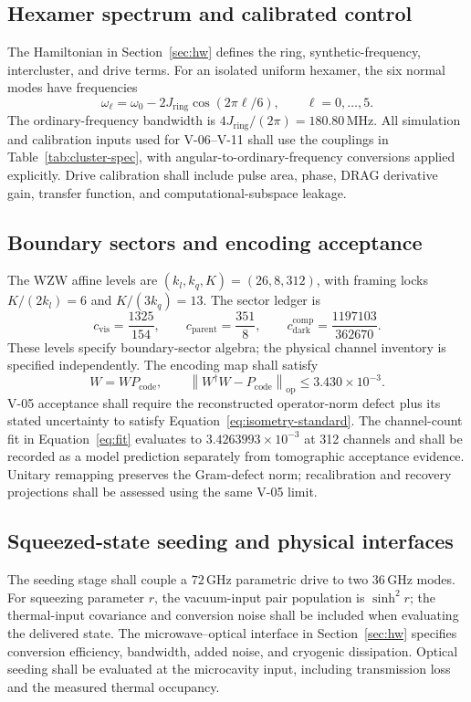 \documentclass[11pt,a4paper]{article}
\newcommand{\op}{\mathrm{op}}
\newcommand{\code}{\mathrm{code}}
\newcommand{\unit}[1]{\,\mathrm{#1}}
\begin{document}
\subsection{Hexamer spectrum and calibrated control}
The Hamiltonian in Section~\ref{sec:hw} defines the ring, synthetic-frequency,
intercluster, and drive terms. For an isolated uniform hexamer, the six normal modes
have frequencies
\[
 \omega_\ell=\omega_0-2J_{\mathrm{ring}}\cos(2\pi\ell/6),
 \qquad \ell=0,\ldots,5.
\]
The ordinary-frequency bandwidth is $4J_{\mathrm{ring}}/(2\pi)=180.80\unit{MHz}$.
All simulation and calibration inputs used for V-06--V-11 shall use the couplings
in Table~\ref{tab:cluster-spec}, with angular-to-ordinary-frequency conversions
applied explicitly. Drive calibration shall include pulse area, phase, DRAG
derivative gain, transfer function, and computational-subspace leakage.

\subsection{Boundary sectors and encoding acceptance}
The WZW affine levels are $(k_l,k_q,K)=(26,8,312)$, with framing locks
$K/(2k_l)=6$ and $K/(3k_q)=13$. The sector ledger is
\[
 c_{\mathrm{vis}}=\frac{1325}{154},\qquad
 c_{\mathrm{parent}}=\frac{351}{8},\qquad
 c_{\mathrm{dark}}^{\mathrm{comp}}=\frac{1197103}{362670}.
\]
These levels specify boundary-sector algebra; the physical channel inventory is
specified independently. The encoding map shall satisfy
\[
 W=WP_\code,\qquad
 \left\|W^\dagger W-P_\code\right\|_\op\le3.430\times10^{-3}.
\]
V-05 acceptance shall require the reconstructed operator-norm defect plus its stated
uncertainty to satisfy Equation~\ref{eq:isometry-standard}. The channel-count fit in
Equation~\ref{eq:fit} evaluates to $3.4263993\times10^{-3}$ at 312 channels and shall
be recorded as a model prediction separately from tomographic acceptance evidence.
Unitary remapping preserves the Gram-defect norm; recalibration and recovery
projections shall be assessed using the same V-05 limit.

\subsection{Squeezed-state seeding and physical interfaces}
The seeding stage shall couple a $72\unit{GHz}$ parametric drive to two
$36\unit{GHz}$ modes. For squeezing parameter $r$, the vacuum-input pair population
is $\sinh^2r$; the thermal-input covariance and conversion noise shall be included
when evaluating the delivered state. The microwave--optical interface in
Section~\ref{sec:hw} specifies conversion efficiency, bandwidth, added noise, and
cryogenic dissipation. Optical seeding shall be evaluated at the microcavity input,
including transmission loss and the measured thermal occupancy.
\end{document}
